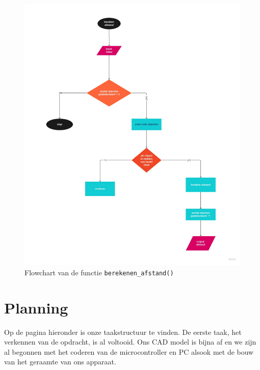 \documentclass[kulak]{kulakarticle} %
\begin{document}
\begin{figure} [!h]
	\centering
	\includegraphics[width = 0.8 \textwidth]{flowchart afstand berekenen.pdf}
\cprotect\caption{Flowchart van de functie \verb*|berekenen_afstand()|}
\end{figure}
 


\section{Planning}
Op de pagina hieronder is onze taakstructuur te vinden. De eerste taak, het verkennen van de opdracht, is al voltooid. Ons CAD model is bijna af en we zijn al begonnen met het coderen van de microcontroller en PC alsook met de bouw van het geraamte van ons apparaat. 

\end{document}
